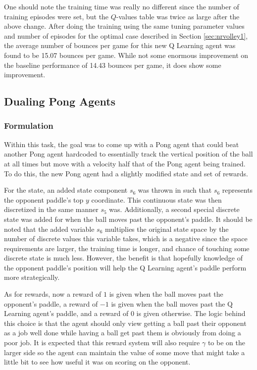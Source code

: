 \documentclass{article}[12pt]
\begin{document}
   One should note the training time was really no different since the number of training episodes were set, but the $Q$-values table was twice as large after the above change. After doing the training using the same tuning parameter values and number of episodes for the optimal case described in Section \ref{sec:nrvolley1}, the average number of bounces per game for this new Q Learning agent was found to be 15.07 bounces per game. While not some enormous improvement on the baseline performance of 14.43 bounces per game, it does show some improvement.
   
   
   \subsection{Dualing Pong Agents}
   \subsubsection{Formulation}
   Within this task, the goal was to come up with a Pong agent that could beat another Pong agent hardcoded to essentially track the vertical position of the ball at all times but move with a velocity half that of the Pong agent being trained. To do this, the new Pong agent had a slightly modified state and set of rewards.
   
   For the state, an added state component $s_6$ was thrown in such that $s_6$ represents the opponent paddle's top $y$ coordinate. This continuous state was then discretized in the same manner $s_5$ was. Additionally, a second special discrete state was added for when the ball moves past the opponent's paddle. It should be noted that the added variable $s_6$ multiplies the original state space by the number of discrete values this variable takes, which is a negative since the space requirements are larger, the training time is longer, and chance of touching some discrete state is much less. However, the benefit is that hopefully knowledge of the opponent paddle's position will help the Q Learning agent's paddle perform more strategically.
   
   As for rewards, now a reward of $1$ is given when the ball moves past the opponent's paddle, a reward of $-1$ is given when the ball moves past the Q Learning agent's paddle, and a reward of $0$ is given otherwise. The logic behind this choice is that the agent should only view getting a ball past their opponent as a job well done while having a ball get past them is obviously from doing a poor job. It is expected that this reward system will also require $\gamma$ to be on the larger side so the agent can maintain the value of some move that might take a little bit to see how useful it was on scoring on the opponent.
   
\end{document}
